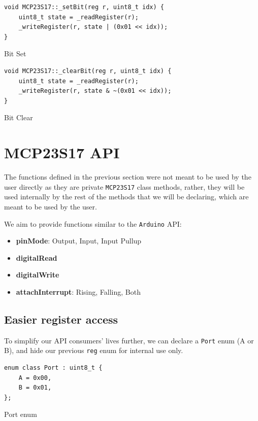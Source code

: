 \documentclass{article}
\begin{document}
\begin{listing}[H]
\begin{verbatim}
void MCP23S17::_setBit(reg r, uint8_t idx) {
    uint8_t state = _readRegister(r);
    _writeRegister(r, state | (0x01 << idx));
}
\end{verbatim}
\caption{Bit Set}
\end{listing}

\begin{listing}[H]
\begin{verbatim}
void MCP23S17::_clearBit(reg r, uint8_t idx) {
    uint8_t state = _readRegister(r);
    _writeRegister(r, state & ~(0x01 << idx));
}
\end{verbatim}
\caption{Bit Clear}
\end{listing}

\section{MCP23S17 API}

The functions defined in the previous section were not meant to be used by the user directly as they are private \verb|MCP23S17| class methods, rather, they will be used internally by the rest of the methods that we will be declaring, which are meant to be used by the user.

We aim to provide functions similar to the \verb|Arduino| API:
\begin{itemize}
    \item \textbf{pinMode}: Output, Input, Input Pullup
    \item \textbf{digitalRead}
    \item \textbf{digitalWrite}
    \item \textbf{attachInterrupt}: Rising, Falling, Both
\end{itemize}

\subsection{Easier register access}

To simplify our API consumers' lives further, we can declare a \verb|Port| enum (A or B), and hide our previous \verb|reg| enum for internal use only.

\begin{listing}[H]
\begin{verbatim}
enum class Port : uint8_t {
    A = 0x00,
    B = 0x01,
};
\end{verbatim}
\caption{Port enum}
\end{listing}
\end{document}
